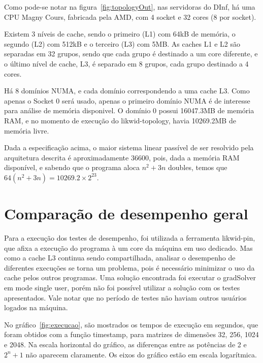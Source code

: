 \documentclass[12pt]{article}
\begin{document}
Como pode-se notar na figura~\ref{fig:topologyOut}, nas servidoras do DInf, há
uma CPU Magny Cours, fabricada pela AMD, com 4 socket e 32 cores (8 por socket).

Existem 3 níveis de cache, sendo o primeiro (L1) com 64kB de memória, o segundo
(L2) com 512kB e o terceiro (L3) com 5MB. As caches L1 e L2 são separadas em 32
grupos, sendo que cada grupo é destinado a um core diferente, e o último nível
de cache, L3, é separado em 8 grupos, cada grupo destinado a 4 cores.

Há 8 domínios NUMA, e cada domínio correspondendo a uma cache L3. Como apenas o
Socket 0 será usado, apenas o primeiro domínio NUMA é de interesse para análise
de memória disponivel. O domínio 0 possui 16047.3MB de memória RAM, e no momento
de execução do likwid-topology, havia 10269.2MB de memória livre.

Dada a especificação acima, o maior sistema linear passível de ser resolvido
pela arquitetura descrita é aproximadamente 36600, pois, dada a memória RAM
disponível, e sabendo que o programa aloca $n^2 + 3n$ doubles, temos que $64(n^2 +
3n) = 10269.2\times2^{23}$.

\section{Comparação de desempenho geral}\label{sec:desempenhoGeral}

Para a execução dos testes de desempenho, foi utilizada a ferramenta
likwid-pin, que afixa a execução do programa à um core da máquina em uso
dedicado. Mas como a cache L3 continua sendo compartilhada, analisar o
desempenho de diferentes execuções se torna um problema, pois é necessário
minimizar o uso da cache pelos outros programas.  Uma solução encontrada foi
executar o gradSolver em mode single user, porém não foi possível utilizar a
solução com os testes apresentados. Vale notar que no período de testes não
haviam outros usuários logados na máquina.

No gráfico~\ref{fig:execucao}, são mostrados os tempos de execução em segundos,
que foram obtidos com a função timestamp, para matrizes de dimensões 32, 256,
1024 e 2048. Na escala horizontal do gráfico, as diferenças entre as potências
de 2 e $2^n+1$ não aparecem claramente. Os eixos do gráfico estão em escala
logarítmica.
\end{document}
